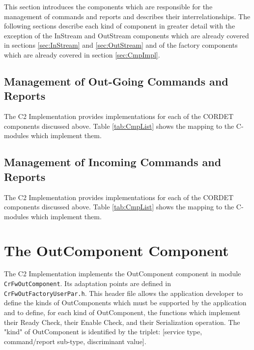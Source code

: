 \documentclass[a4paper,10pt]{article}
\let\stdsection\section
\renewcommand\section{\newpage\stdsection}
\begin{document}
This section introduces the components which are responsible for the management of commands and reports and describes their interrelationships. The following sections describe each kind of component in greater detail with the exception of the InStream and OutStream components which are already covered in sections \ref{sec:InStream} and \ref{sec:OutStream} and of the factory components which are already covered in section \ref{sec:CmpImpl}.

\subsection{Management of Out-Going Commands and Reports}\label{sec:ManagementOfOutGoingCmdAndRep}


The C2 Implementation provides implementations for each of the CORDET components discussed above. Table \ref{tab:CmpList} shows the mapping to the C-modules which implement them.

\subsection{Management of Incoming Commands and Reports}\label{sec:ManagementOfIncomingCmdAndRep}


The C2 Implementation provides implementations for each of the CORDET components discussed above. Table \ref{tab:CmpList} shows the mapping to the C-modules which implement them.


\section{The OutComponent Component}\label{sec:OutComponent}
 

The C2 Implementation implements the OutComponent component in module \texttt{CrFwOutComponent}. Its adaptation points are defined in \texttt{CrFwOutFactoryUserPar.h}. This header file allows the application developer to define the kinds of OutComponents which must be supported by the application and to define, for each kind of OutComponent, the functions which implement their Ready Check, their Enable Check, and their Serialization operation. The "kind" of OutComponent is identified by the triplet: [service type, command/report sub-type, discriminant value]. 
\end{document}
